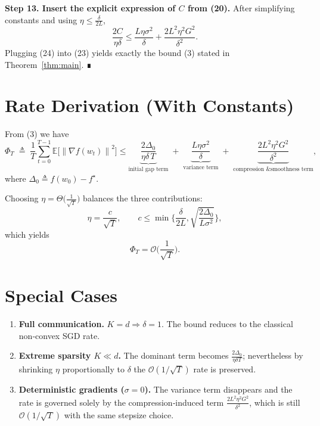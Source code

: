 \documentclass{article}
\newcommand{\E}{\mathbb{E}}
\newcommand{\norm}[1]{\left\|#1\right\|}
\newcommand{\grad}{\nabla}
\begin{document}
\noindent\textbf{Step 13. Insert the explicit expression of $C$ from (20).}  
After simplifying constants and using $\eta\le\frac{\delta}{2L}$,
\[
\frac{2C}{\eta\delta}
\le \frac{L\eta\sigma^{2}}{\delta}
+\frac{2L^{2}\eta^{2}G^{2}}{\delta^{2}}.
\tag{24}
\]
Plugging (24) into (23) yields exactly the bound (3) stated in Theorem~\ref{thm:main}. ∎

\section*{Rate Derivation (With Constants)}
From (3) we have
\[
\Phi_T\;\triangleq\;\frac{1}{T}\sum_{t=0}^{T-1}\E\!\big[\norm{\grad f(w_t)}^{2}\big]
\le
\underbrace{\frac{2\Delta_0}{\eta\delta\,T}}_{\text{initial gap term}}
\;+\;
\underbrace{\frac{L\eta\sigma^{2}}{\delta}}_{\text{variance term}}
\;+\;
\underbrace{\frac{2L^{2}\eta^{2}G^{2}}{\delta^{2}}}_{\text{compression \& smoothness term}},
\]
where $\Delta_0\triangleq f(w_0)-f^{\star}$.

Choosing $\eta = \Theta\!\big(\frac{1}{\sqrt{T}}\big)$ balances the three contributions:
\[
\eta = \frac{c}{\sqrt{T}},\qquad
c\le\min\Big\{\frac{\delta}{2L},\sqrt{\frac{2\Delta_0}{L\sigma^{2}}}\Big\},
\]
which yields
\[
\Phi_T = \mathcal O\!\Big(\frac{1}{\sqrt{T}}\Big).
\]

\section*{Special Cases}
\begin{enumerate}[label=\alph*)]
\item \textbf{Full communication.} $K=d\Rightarrow\delta=1$. The bound reduces to the classical non‑convex SGD rate.
\item \textbf{Extreme sparsity $K\ll d$.} The dominant term becomes $\frac{2\Delta_0}{\eta\delta T}$; nevertheless by shrinking $\eta$ proportionally to $\delta$ the $\mathcal O(1/\sqrt{T})$ rate is preserved.
\item \textbf{Deterministic gradients ($\sigma=0$).} The variance term disappears and the rate is governed solely by the compression‑induced term $\frac{2L^{2}\eta^{2}G^{2}}{\delta^{2}}$, which is still $\mathcal O(1/\sqrt{T})$ with the same stepsize choice.
\end{enumerate}
\end{document}
